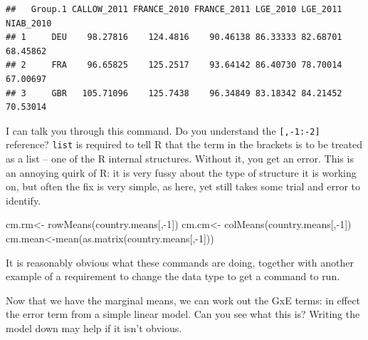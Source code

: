 \documentclass[
]{book}
\newenvironment{Shaded}{\begin{snugshade}}{\end{snugshade}}
\newcommand{\DecValTok}[1]{\textcolor[rgb]{0.00,0.00,0.81}{#1}}
\newcommand{\FunctionTok}[1]{\textcolor[rgb]{0.00,0.00,0.00}{#1}}
\newcommand{\NormalTok}[1]{#1}
\newcommand{\OtherTok}[1]{\textcolor[rgb]{0.56,0.35,0.01}{#1}}
\newcommand{\SpecialCharTok}[1]{\textcolor[rgb]{0.00,0.00,0.00}{#1}}
\begin{document}
\begin{Shaded}
\end{Shaded}

\begin{verbatim}
##   Group.1 CALLOW_2011 FRANCE_2010 FRANCE_2011 LGE_2010 LGE_2011 NIAB_2010
## 1     DEU    98.27816    124.4816    90.46138 86.33333 82.68701  68.45862
## 2     FRA    96.65825    125.2517    93.64142 86.40730 78.70014  67.00697
## 3     GBR   105.71096    125.7438    96.34849 83.18342 84.21452  70.53014
\end{verbatim}

I can talk you through this command. Do you understand the \texttt{{[},-1:-2{]}} reference? \texttt{list} is required to tell R that the term in the brackets is to be treated as a list -- one of the R internal structures. Without it, you get an error. This is an annoying quirk of R: it is very fussy about the type of structure it is working on, but often the fix is very simple, as here, yet still takes some trial and error to identify.

\begin{Shaded}
\begin{Highlighting}[]
\NormalTok{cm.rm}\OtherTok{\textless{}{-}} \FunctionTok{rowMeans}\NormalTok{(country.means[,}\SpecialCharTok{{-}}\DecValTok{1}\NormalTok{])}
\NormalTok{cm.cm}\OtherTok{\textless{}{-}} \FunctionTok{colMeans}\NormalTok{(country.means[,}\SpecialCharTok{{-}}\DecValTok{1}\NormalTok{])}
\NormalTok{cm.mean}\OtherTok{\textless{}{-}}\FunctionTok{mean}\NormalTok{(}\FunctionTok{as.matrix}\NormalTok{(country.means[,}\SpecialCharTok{{-}}\DecValTok{1}\NormalTok{]))}
\end{Highlighting}
\end{Shaded}

It is reasonably obvious what these commands are doing, together with another example of a requirement to change the data type to get a command to run.

Now that we have the marginal means, we can work out the GxE terms: in effect the error term from a simple linear model. Can you see what this is? Writing the model down may help if it isn't obvious.
\end{document}
